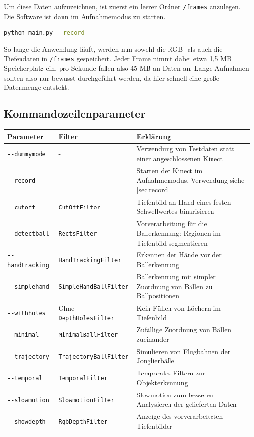 \documentclass[12pt,a4paper,ngerman]{scrartcl}
\begin{document}
\label{sec:record}
Um diese Daten aufzuzeichnen, ist zuerst ein leerer Ordner \lstinline{/frames} anzulegen. Die Software ist 
dann im Aufnahmemodus zu starten.

\begin{lstlisting}[language=bash]
python main.py --record
\end{lstlisting}

So lange die Anwendung läuft, werden nun sowohl die RGB- als auch die Tiefendaten in \lstinline{/frames} 
gespeichert. Jeder Frame nimmt dabei etwa 1,5 MB Speicherplatz ein, pro Sekunde fallen also 45 MB an Daten
an. Lange Aufnahmen sollten also nur bewusst durchgeführt werden, da hier schnell eine große Datenmenge 
entsteht.


\subsection{Kommandozeilenparameter}
\label{sec:parameter}

\begin{tabular}{llp{8cm}}
Parameter & Filter & Erklärung \\ \hline
{\lstinline!--dummymode!} & - & Verwendung von Testdaten statt einer angeschlossenen Kinect \\
{\lstinline!--record!} & - & Starten der Kinect im Aufnahmemodus, Verwendung siehe \ref{sec:record}\\
{\lstinline!--cutoff!} & {\lstinline!CutOffFilter!} & Tiefenbild an Hand eines festen Schwellwertes binarisieren \\
{\lstinline!--detectball!} & {\lstinline!RectsFilter!} & Vorverarbeitung für die Ballerkennung: Regionen im Tiefenbild segmentieren \\
{\lstinline!--handtracking!} & {\lstinline!HandTrackingFilter!} & Erkennen der Hände vor der Ballerkennung \\
{\lstinline!--simplehand!} & {\lstinline!SimpleHandBallFilter!} & Ballerkennung mit simpler Zuordnung von Bällen zu Ballpositionen\\
{\lstinline!--withholes!} & Ohne {\lstinline!DepthHolesFilter!} & Kein Füllen von Löchern im Tiefenbild \\
{\lstinline!--minimal!} & {\lstinline!MinimalBallFilter!} &  Zufällige Zuordnung von Bällen zueinander\\
{\lstinline!--trajectory!} & {\lstinline!TrajectoryBallFilter!} &  Simulieren von Flugbahnen der Jonglierbälle\\
{\lstinline!--temporal!} & {\lstinline!TemporalFilter!} & Temporales Filtern zur Objekterkennung\\
{\lstinline!--slowmotion!} & {\lstinline!SlowmotionFilter!} &  Slowmotion zum besseren Analysieren der gelieferten Daten\\
{\lstinline!--showdepth!} & {\lstinline!RgbDepthFilter!} & Anzeige des vorverarbeiteten Tiefenbilder
\end{tabular}
\end{document}
